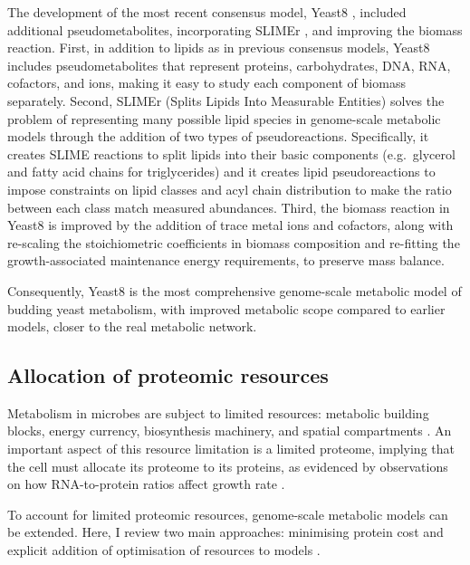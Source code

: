 The development of the most recent consensus model, Yeast8 \parencite{luConsensusCerevisiaeMetabolic2019}, included additional pseudometabolites, incorporating SLIMEr \parencite{sanchezSLIMErProbingFlexibility2019}, and improving the biomass reaction.
First, in addition to lipids as in previous consensus models, Yeast8 includes pseudometabolites that represent proteins, carbohydrates, DNA, RNA, cofactors, and ions, making it easy to study each component of biomass separately.
Second, SLIMEr (Splits Lipids Into Measurable Entities) solves the problem of representing many possible lipid species in genome-scale metabolic models through the addition of two types of pseudoreactions.
Specifically, it creates SLIME reactions to split lipids into their basic components (e.g.\ glycerol and fatty acid chains for triglycerides) and it creates lipid pseudoreactions to impose constraints on lipid classes and acyl chain distribution to make the ratio between each class match measured abundances.
Third, the biomass reaction in Yeast8 is improved by the addition of trace metal ions and cofactors, along with re-scaling the stoichiometric coefficients in biomass composition and re-fitting the growth-associated maintenance energy requirements, to preserve mass balance.

Consequently, Yeast8 is the most comprehensive genome-scale metabolic model of budding yeast metabolism, with improved metabolic scope compared to earlier models, closer to the real metabolic network.


\subsection{Allocation of proteomic resources}
\label{subsec:intro-fba-ec}

Metabolism in microbes are subject to limited resources: metabolic building blocks, energy currency, biosynthesis machinery, and spatial compartments \parencite{elsemmanWholecellModelingYeast2022}.
An important aspect of this resource limitation is a limited proteome, implying that the cell must allocate its proteome to its proteins, as evidenced by observations on how RNA-to-protein ratios affect growth rate \parencite{scottBacterialGrowthLaws2011}.

To account for limited proteomic resources, genome-scale metabolic models can be extended.
Here, I review two main approaches: minimising protein cost and explicit addition of optimisation of resources to models \parencite{adjavonComputationalAnalysisSinglecell2022}.

